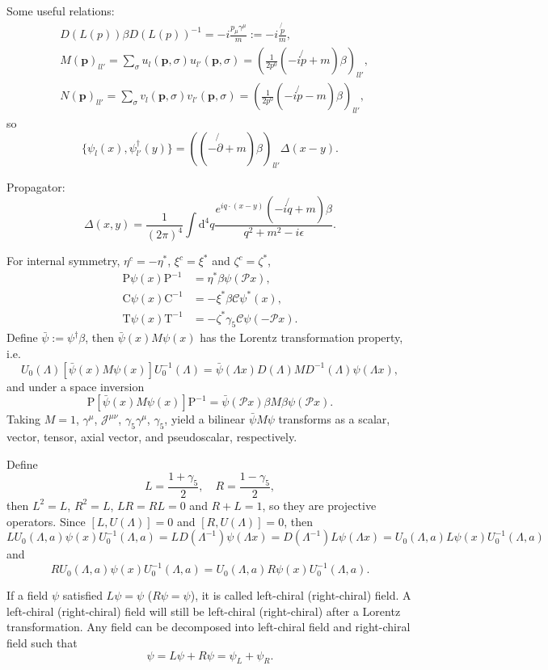 \documentclass[9pt]{extbook}
\begin{document}
Some useful relations:
\[
\begin{split}
	&D(L(p))\beta D(L(p))^{-1}=-i\frac{p_\mu \gamma^\mu}{m}:=-i\frac{\not{p}}{m},\\
	&M(\bm{p})_{ll'}=\sum_{\sigma}u_l(\bm{p},\sigma)u_{l'}(\bm{p},\sigma)=\left(\frac{1}{2p^0}(-i\not{p}+m)\beta\right)_{ll'},\\
	&N(\bm{p})_{ll'}=\sum_{\sigma}v_l(\bm{p},\sigma)v_{l'}(\bm{p},\sigma)=\left(\frac{1}{2p^0}(-i\not{p}-m)\beta\right)_{ll'},
\end{split}
\]
so
\[
	\{\psi_l(x),\psi_{l'}^\dag (y)\}=\left((-\not{\partial}+m)\beta\right)_{ll'}\Delta(x-y).
\]

Propagator:
\[
	\Delta(x,y)=\frac{1}{(2\pi)^4}\int \mathrm{d}^4q \frac{e^{iq\cdot (x-y)}(-i\not{q}+m)\beta}{q^2+m^2-i\epsilon}.
\]

For internal symmetry, $\eta^c=-\eta^*$, $\xi^c=\xi^*$ and $\zeta^c=\zeta^*$,
\[
\begin{split}
	\mathrm{P}\psi(x)\mathrm{P}^{-1}&=\eta^*\beta\psi(\mathscr{P}x),\\
	\mathrm{C}\psi(x)\mathrm{C}^{-1}&=-\xi^*\beta\mathscr{C}\psi^*(x),\\
	\mathrm{T}\psi(x)\mathrm{T}^{-1}&=-\zeta^*\gamma_5\mathscr{C}\psi(-\mathscr{P}x).
\end{split}
\]
Define $\bar{\psi}:=\psi^{\dag}\beta$, then $\bar{\psi}(x)M \psi(x)$ has the Lorentz transformation property, i.e.
\[
	U_0(\Lambda)[\bar{\psi}(x)M \psi(x)]U_0^{-1}(\Lambda)=\bar{\psi}(\Lambda x)D(\Lambda) M D^{-1}(\Lambda)\psi(\Lambda x),
\]
and under a space inversion
\[
	\mathrm{P}[\bar{\psi}(x)M \psi(x)]\mathrm{P}^{-1}=\bar{\psi}(\mathscr{P}x)\beta M\beta \psi(\mathscr{P}x).
\]
Taking $M=1$, $\gamma^\mu$, $\mathscr{J}^{\mu\nu}$, $\gamma_5\gamma^\mu$, $\gamma_5$, yield a bilinear $\bar{\psi}M \psi$ transforms as a scalar, vector, tensor, axial vector, and pseudoscalar, respectively.

Define 
\[
	L=\frac{1+\gamma_5}{2},\quad R=\frac{1-\gamma_5}{2},
\]
then $L^2=L$, $R^2=L$, $LR=RL=0$ and $R+L=1$, so they are projective operators. Since $[L,U(\Lambda)]=0$ and $[R,U(\Lambda)]=0$, then
\[
	LU_0(\Lambda,a)\psi(x)U_0^{-1}(\Lambda,a)=LD(\Lambda^{-1})\psi(\Lambda x)=D(\Lambda^{-1})L\psi(\Lambda x)=U_0(\Lambda,a)L\psi(x)U_0^{-1}(\Lambda,a)
\]
and
\[
	RU_0(\Lambda,a)\psi(x)U_0^{-1}(\Lambda,a)=U_0(\Lambda,a)R\psi(x)U_0^{-1}(\Lambda,a).
\]

If a field $\psi$ satisfied $L\psi=\psi$ ($R\psi=\psi$), it is called left-chiral (right-chiral) field. A left-chiral (right-chiral) field will still be left-chiral (right-chiral) after a Lorentz transformation. Any field can be decomposed into left-chiral field and right-chiral field such that
\[
	\psi=L\psi+R\psi=\psi_L+\psi_R.
\]
\end{document}
